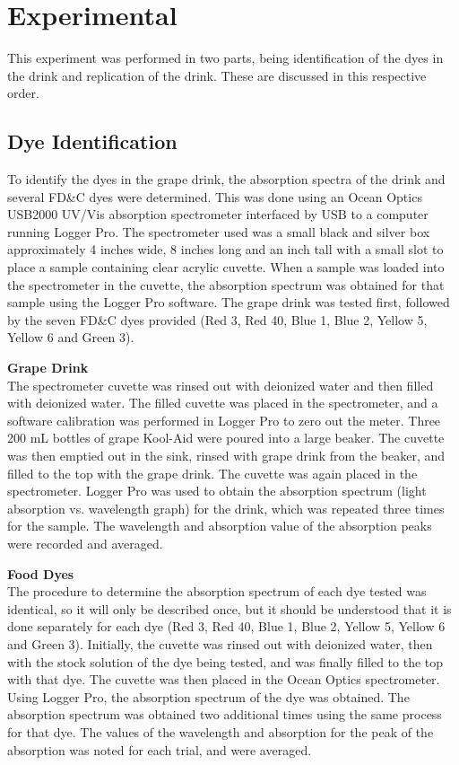 \documentclass[12pt]{article}
\begin{document}
\section{Experimental}
This experiment was performed in two parts, being identification of the dyes in the drink and replication of the drink. These are discussed in this respective order.
\subsection*{Dye Identification}
To identify the dyes in the grape drink, the absorption spectra of the drink and several FD\&C dyes were determined. This was done using an Ocean Optics USB2000 UV/Vis absorption spectrometer interfaced by USB to a computer running Logger Pro. The spectrometer used was a small black and silver box approximately 4 inches wide, 8 inches long and an inch tall with a small slot to place a sample containing clear acrylic cuvette.  When a sample was loaded into the spectrometer in the cuvette, the absorption spectrum was obtained for that sample using the Logger Pro software. The grape drink was tested first, followed by the seven FD\&C dyes provided (Red 3, Red 40, Blue 1, Blue 2, Yellow 5, Yellow 6 and Green 3).\par
\pagebreak
\textbf{Grape Drink}\\
The spectrometer cuvette was rinsed out with deionized water and then filled with deionized water. The filled cuvette was placed in the spectrometer, and a software calibration was performed in Logger Pro to zero out the meter. Three 200 mL bottles of grape Kool-Aid were poured into a large beaker. The cuvette was then emptied out in the sink, rinsed with grape drink from the beaker, and filled to the top with the grape drink. The cuvette was again placed in the spectrometer. Logger Pro was used to obtain the absorption spectrum (light absorption vs. wavelength graph) for the drink, which was repeated three times for the sample. The wavelength and absorption value of the absorption peaks were recorded and averaged.

\vspace{6pt}\textbf{Food Dyes}\\
The procedure to determine the absorption spectrum of each dye tested was identical, so it will only be described once, but it should be understood that it is done separately for each dye (Red 3, Red 40, Blue 1, Blue 2, Yellow 5, Yellow 6 and Green 3). Initially, the cuvette was rinsed out with deionized water, then with the stock solution of the dye being tested, and was finally filled to the top with that dye. The cuvette was then placed in the Ocean Optics spectrometer. Using Logger Pro, the absorption spectrum of the dye was obtained. The absorption spectrum was obtained two additional times using the same process for that dye. The values of the wavelength and absorption for the peak of the absorption was noted for each trial, and were averaged.
\end{document}
